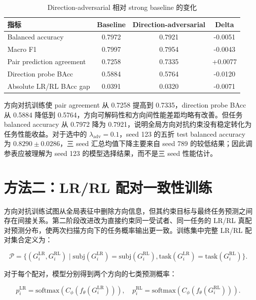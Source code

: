 \begin{table}[H]
  \centering
  \caption{Direction-adversarial 相对 strong baseline 的变化}
  \small
  \begin{tabularx}{\linewidth}{>{\raggedright\arraybackslash}Xccc}
    \toprule
    指标 & Baseline & Direction-adversarial & Delta \\
    \midrule
    Balanced accuracy & 0.7972 & 0.7921 & -0.0051 \\
    Macro F1 & 0.7997 & 0.7954 & -0.0043 \\
    Pair prediction agreement & 0.7258 & 0.7335 & +0.0077 \\
    Direction probe BAcc & 0.5884 & 0.5764 & -0.0120 \\
    Absolute LR/RL BAcc gap & 0.0391 & 0.0320 & -0.0071 \\
    \bottomrule
  \end{tabularx}
\end{table}

方向对抗训练使 pair agreement 从 0.7258 提高到 0.7335，direction probe BAcc 从 0.5884 降低到 0.5764，方向可解码性和方向间性能差距均略有改善。但任务 balanced accuracy 从 0.7972 降为 0.7921，说明全局方向对抗约束没有稳定转化为任务性能收益。对于选中的 $\lambda_{\mathrm{adv}}=0.1$，seed 123 的五折 test balanced accuracy 为 $0.8290 \pm 0.0286$，三 seed 汇总均值下降主要来自 seed 789 的较低结果；因此调参表应被理解为 seed 123 的模型选择结果，而不是三 seed 性能估计。

\section{方法二：LR/RL 配对一致性训练}

方向对抗训练试图从全局表征中删除方向信息，但其约束目标与最终任务预测之间存在间接关系。第二阶段改进改为直接约束同一受试者、同一任务的 LR/RL 真配对预测分布，使两次扫描方向下的任务概率输出更一致。训练集中完整 LR/RL 配对集合定义为：

\begin{equation}
  \mathcal{P} =
  \{(G_i^{\mathrm{LR}},G_i^{\mathrm{RL}})
  \mid
  \mathrm{subj}(G_i^{\mathrm{LR}})=\mathrm{subj}(G_i^{\mathrm{RL}}),
  \mathrm{task}(G_i^{\mathrm{LR}})=\mathrm{task}(G_i^{\mathrm{RL}})\}.
\end{equation}

对于每个配对，模型分别得到两个方向的七类预测概率：

\begin{equation}
  p_i^{\mathrm{LR}}=\mathrm{softmax}(C_{\phi}(f_{\theta}(G_i^{\mathrm{LR}}))), \quad
  p_i^{\mathrm{RL}}=\mathrm{softmax}(C_{\phi}(f_{\theta}(G_i^{\mathrm{RL}}))).
\end{equation}

